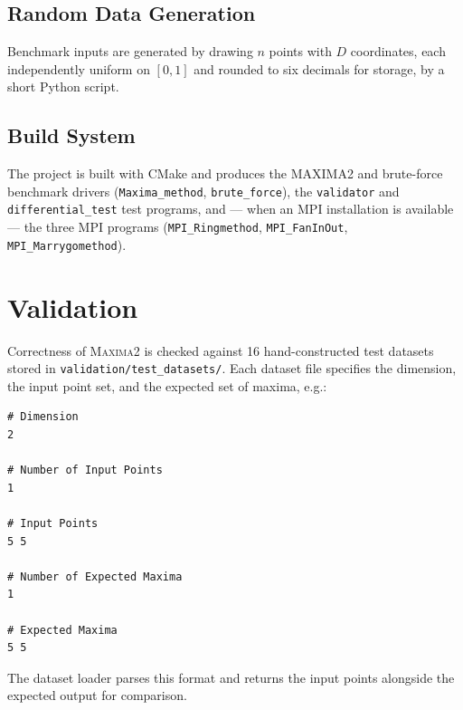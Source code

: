 \documentclass[11pt]{article}
\begin{document}
\subsection{Random Data Generation}

Benchmark inputs are generated by drawing $n$ points with $D$
coordinates, each independently uniform on $[0,1]$ and rounded to six
decimals for storage, by a short Python script.



\subsection{Build System}

The project is built with CMake and produces the MAXIMA2 and brute-force
benchmark drivers (\texttt{Maxima\_method}, \texttt{brute\_force}), the
\texttt{validator} and \texttt{differential\_test} test programs, and ---
when an MPI installation is available --- the three MPI programs
(\texttt{MPI\_Ringmethod}, \texttt{MPI\_FanInOut},
\texttt{MPI\_Marrygomethod}).



\section{Validation}

Correctness of \textsc{Maxima2} is checked against 16 hand-constructed
test datasets stored in \texttt{validation/test\_datasets/}. Each dataset
file specifies the dimension, the input point set, and the expected set
of maxima, e.g.:

\begin{verbatim}
# Dimension
2

# Number of Input Points
1

# Input Points
5 5

# Number of Expected Maxima
1

# Expected Maxima
5 5
\end{verbatim}

The dataset loader parses this format and returns the input points
alongside the expected output for comparison.


\end{document}
